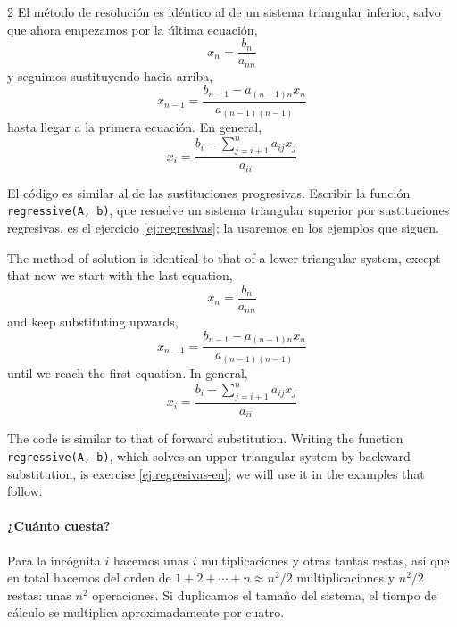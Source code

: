 \begin{paracol}{2}
El método de resolución es idéntico al de un sistema triangular inferior, salvo que ahora empezamos por la última ecuación,
\begin{equation*}
x_n=\frac{b_n}{a_{nn}}
\end{equation*}
y seguimos sustituyendo hacia arriba,
\begin{equation*}
x_{n-1}=\frac{b_{n-1}-a_{(n-1)n}x_{n}}{a_{(n-1)(n-1)}}
\end{equation*}
hasta llegar a la primera ecuación. En general,
\begin{equation*}
x_i=\frac{b_i-\sum_{j=i+1}^{n}a_{ij}x_j}{a_{ii}}
\end{equation*}

El código es similar al de las sustituciones progresivas. Escribir la función \texttt{regressive(A, b)}, que resuelve un sistema triangular superior por sustituciones regresivas, es el ejercicio \ref{ej:regresivas}; la usaremos en los ejemplos que siguen.

\switchcolumn
The method of solution is identical to that of a lower triangular system, except that now we start with the last equation,
\begin{equation*}
x_n=\frac{b_n}{a_{nn}}
\end{equation*}
and keep substituting upwards,
\begin{equation*}
x_{n-1}=\frac{b_{n-1}-a_{(n-1)n}x_{n}}{a_{(n-1)(n-1)}}
\end{equation*}
until we reach the first equation. In general,
\begin{equation*}
x_i=\frac{b_i-\sum_{j=i+1}^{n}a_{ij}x_j}{a_{ii}}
\end{equation*}

The code is similar to that of forward substitution. Writing the function \texttt{regressive(A, b)}, which solves an upper triangular system by backward substitution, is exercise \ref{ej:regresivas-en}; we will use it in the examples that follow.

\switchcolumn
\paragraph{¿Cuánto cuesta?} Para la incógnita $i$ hacemos unas $i$ multiplicaciones y otras tantas restas, así que en total hacemos del orden de $1+2+\cdots+n\approx n^2/2$ multiplicaciones y $n^2/2$ restas: unas $n^2$ operaciones. Si duplicamos el tamaño del sistema, el tiempo de cálculo se multiplica aproximadamente por cuatro.


\end{paracol}
